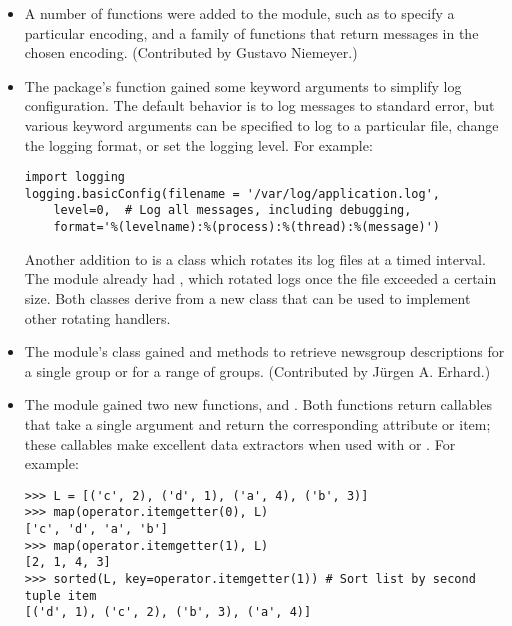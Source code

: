 \documentclass{howto}
\begin{document}
\begin{itemize}
\item  A number of functions were added to the  
module, such as  to specify a
particular encoding, and a family of  functions
that return messages in the chosen encoding.
(Contributed by Gustavo Niemeyer.)

\item The  package's  function 
gained some keyword arguments to simplify log configuration.  The
default behavior is to log messages to standard error, but
various keyword arguments can be specified to log to a particular file,
change the logging format, or set the logging level.  For example:

\begin{verbatim}
import logging
logging.basicConfig(filename = '/var/log/application.log',
    level=0,  # Log all messages, including debugging,
    format='%(levelname):%(process):%(thread):%(message)')	            
\end{verbatim}

Another addition to  is a
 class which rotates its log files at
a timed interval.  The module already had ,
which rotated logs once the file exceeded a certain size.  Both
classes derive from a new  class that can
be used to implement other rotating handlers.

\item The  module's  class gained
 and  methods to retrieve 
newsgroup descriptions for a single group or for a range of groups.
(Contributed by J\"urgen A. Erhard.)

\item The  module gained two new functions, 
 and .
Both functions return callables that take a single argument and return
the corresponding attribute or item; these callables make excellent
data extractors when used with  or
.  For example:

\begin{verbatim}
>>> L = [('c', 2), ('d', 1), ('a', 4), ('b', 3)]
>>> map(operator.itemgetter(0), L)
['c', 'd', 'a', 'b']
>>> map(operator.itemgetter(1), L)
[2, 1, 4, 3]
>>> sorted(L, key=operator.itemgetter(1)) # Sort list by second tuple item
[('d', 1), ('c', 2), ('b', 3), ('a', 4)]
\end{verbatim}


\end{itemize}
\end{document}
